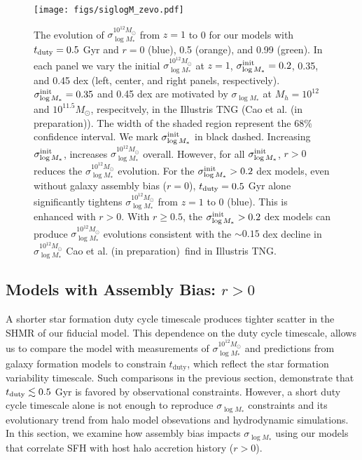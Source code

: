 \documentclass[12pt, letterpaper, preprint, tighten]{aastex62}
\newcommand{\edt}[1]{{\color{dred}{\bf} #1}}
\newcommand{\cao}{Cao et al. (in preparation)}
\newcommand{\tduty}{t_{\rm duty}}
\newcommand{\siglogm}{\sigma_{\log M_*}}
\begin{document}
\begin{figure}
\begin{center}
    \texttt{[image: figs/siglogM\_zevo.pdf]}
    \caption{\edt{The evolution of $\siglogm^{10^{12}M_\odot}$ from $z=1$ to 0 
    for our models with $t_{\rm duty} = 0.5$ Gyr and $r = 0$ (blue), 0.5 (orange), 
    and 0.99 (green). In each panel we vary the initial $\siglogm^{10^{12}M_\odot}$
    at $z=1$, $\siglogm^{\rm init} = 0.2$, 0.35, and 0.45 dex (left, center, and right
    panels, respectively). $\siglogm^{\rm init} = 0.35$ and 0.45 dex are motivated by 
    $\siglogm$ at $M_h = 10^{12}$ and $10^{11.5}M_\odot$, respecitvely, in the Illustris 
    TNG (\cao). The width of the shaded region represent the $68\%$ confidence interval. 
    We mark $\siglogm^{\rm init}$ in black dashed. Increasing $\siglogm^{\rm init}$, 
    increases $\siglogm^{10^{12}M_\odot}$ overall. However, for all $\siglogm^{\rm init}$, 
    $r > 0$ reduces the $\siglogm^{10^{12}M_\odot}$ evolution. For the $\siglogm^{\rm init}>0.2$
    dex models, even without galaxy assembly bias ($r = 0$), $\tduty = 0.5$ Gyr alone 
    significantly tightens $\siglogm^{10^{12}M_\odot}$ from $z = 1$ to 0 (blue). This is 
    enhanced with $r > 0$. With $r \ge 0.5$, the $\siglogm^{\rm init} > 0.2$ dex models 
    can produce $\siglogm^{10^{12}M_\odot}$ evolutions consistent with the $\sim 0.15$ dex
    decline in $\siglogm^{10^{12}M_\odot}$ \cao~find in Illustris TNG.}}
\label{fig:siglogM_zevo}
\end{center}
\end{figure}

\subsection{\edt{Models with Assembly Bias: $r > 0$}}
A shorter star formation duty cycle timescale produces tighter scatter in the
SHMR of our \edt{fiducial} model. This dependence on the duty cycle timescale,
allows us to compare the model with measurements of $\siglogm^{10^{12}M_\odot}$ 
and predictions from galaxy formation models to constrain $t_\mathrm{duty}$, which
reflect the star formation variability timescale. Such comparisons in the previous
section, demonstrate that $t_{\rm duty} \lesssim 0.5$ Gyr is favored by 
observational constraints. However, a short duty cycle timescale alone is not 
enough to reproduce $\siglogm$ constraints and its evolutionary trend 
\edt{from halo model obsevations and hydrodynamic simulations. In this section, 
we examine how assembly bias impacts $\siglogm$ using our models that correlate SFH 
with host halo accretion history ($r > 0$).}
\end{document}
